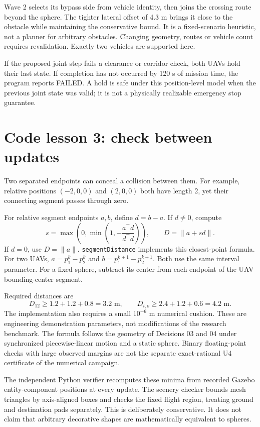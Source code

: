 Wave 2 selects its bypass side from vehicle identity, then joins the crossing route beyond the sphere. The tighter lateral offset of 4.3 m brings it close to the obstacle while maintaining the conservative bound. It is a fixed-scenario heuristic, not a planner for arbitrary obstacles. Changing geometry, routes or vehicle count requires revalidation. Exactly two vehicles are supported here.

If the proposed joint step fails a clearance or corridor check, both UAVs hold their last state. If completion has not occurred by 120 s of mission time, the program reports FAILED. A hold is safe under this position-level model when the previous joint state was valid; it is not a physically realizable emergency stop guarantee.

\section{Code lesson 3: check between updates}
Two separated endpoints can conceal a collision between them. For example, relative positions $(-2,0,0)$ and $(2,0,0)$ both have length 2, yet their connecting segment passes through zero.

For relative segment endpoints $a,b$, define $d=b-a$. If $d\ne0$, compute
\[s=\max\left(0,\min\left(1,-\frac{a^\top d}{d^\top d}\right)\right),\qquad D=\|a+sd\|.\]
If $d=0$, use $D=\|a\|$. \texttt{segmentDistance} implements this closest-point formula. For two UAVs, $a=p_1^k-p_2^k$ and $b=p_1^{k+1}-p_2^{k+1}$. Both use the same interval parameter. For a fixed sphere, subtract its center from each endpoint of the UAV bounding-center segment.

Required distances are
\[D_{12}\ge1.2+1.2+0.8=3.2\text{ m},\qquad D_{i,o}\ge2.4+1.2+0.6=4.2\text{ m}.\]
The implementation also requires a small $10^{-6}$ m numerical cushion. These are engineering demonstration parameters, not modifications of the research benchmark. The formula follows the geometry of Decisions 03 and 04 under synchronized piecewise-linear motion and a static sphere. Binary floating-point checks with large observed margins are not the separate exact-rational U4 certificate of the numerical campaign.

The independent Python verifier recomputes these minima from recorded Gazebo entity-component positions at every update. The scenery checker bounds mesh triangles by axis-aligned boxes and checks the fixed flight region, treating ground and destination pads separately. This is deliberately conservative. It does not claim that arbitrary decorative shapes are mathematically equivalent to spheres.

